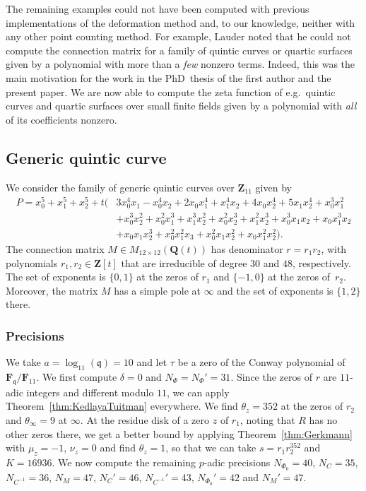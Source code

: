 \documentclass[a4paper,11pt]{article}
\numberwithin{equation}{section}
\newcommand{\ZZ}{\mathbf{Z}} %
\newcommand{\QQ}{\mathbf{Q}} %
\newcommand{\FF}{\mathbf{F}} %
\theoremstyle{definition}
\begin{document}
The remaining examples could not have been computed with previous implementations 
of the deformation method and, to our knowledge, neither with any other point counting 
method.  For example, Lauder noted that he could not compute the connection matrix 
for a family of quintic curves or quartic surfaces given by a polynomial with more 
than a \emph{few} nonzero terms.  Indeed, this was the main motivation for the work 
in the PhD~thesis of the first author and the present paper.  We are now able to 
compute the zeta function of e.g.\ quintic curves and quartic surfaces over small 
finite fields given by a polynomial with \emph{all} of its coefficients nonzero.

\subsection{Generic quintic curve}

We consider the family of generic quintic curves over $\ZZ_{11}$ given by 
\begin{equation*}
\begin{split}
P = x_0^5 + x_1^5 + x_2^5 
+ t \bigl( & 3x_0^4 x_1-x_0^4 x_2+2 x_0 x_1^4+x_1^4 x_2+4 x_0 x_2^4+5 x_1 x_2^4 + x_0^3 x_1^2 \\
           & + x_0^3 x_2^2 + x_0^2 x_1^3+ x_1^3 x_2^2+x_0^2 x_2^3+x_1^2 x_2^3 + x_0^3 x_1 x_2 + x_0 x_1^3 x_2 \\
           & + x_0 x_1 x_2^3 + x_0^2 x_1^2 x_3 + x_0^2 x_1 x_2^2 + x_0 x_1^2 x_2^2 \bigr).
\end{split}
\end{equation*}
The connection matrix $M \in M_{12 \times 12}(\QQ(t))$ has denominator 
$r = r_1 r_2$, with polynomials $r_1,r_2 \in \ZZ[t]$ that are irreducible 
of degree $30$ and $48$, respectively. The set of exponents is $\{ 0,1 \}$ 
at the zeros of $r_1$ and $\{ -1,0 \}$ at the zeros of~$r_2$. Moreover, 
the matrix $M$ has a simple pole at $\infty$ and the set of exponents 
is $\{1,2\}$ there.

\subsubsection{Precisions}

We take $a=\log_{11}(\mathfrak{q})=10$ and let $\tau$ be a zero of the Conway polynomial of 
$\FF_{\mathfrak{q}}/\FF_{11}$. We first compute $\delta=0$ and $N_{\Phi}=N_{\Phi}'=31$.
Since the zeros of $r$ are $11$-adic integers and different modulo $11$, we can apply 
Theorem~\ref{thm:KedlayaTuitman} everywhere. We find $\theta_z=352$ at the zeros of $r_2$
and $\theta_{\infty}=9$ at $\infty$. At the residue disk of a zero $z$ of $r_1$, noting that 
$R$ has no other zeros there, we get a better bound by applying 
Theorem~\ref{thm:Gerkmann} with $\mu_z=-1$, $\nu_z=0$ and find $\theta_z=1$, so that we can 
take $s=r_1 r_2^{352}$ and $K=16936$. We now compute the remaining $p$-adic precisions 
$N_{\Phi_0}=40$, $N_C=35$, $N_{C^{-1}}=36$, $N_M=47$, $N_C'=46$, $N_{C^{-1}}'=43$, 
$N_{\Phi_0}'=42$ and $N_M'=47$.
\end{document}
